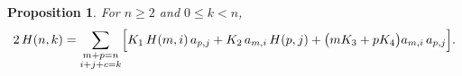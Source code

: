 \documentclass[11pt]{article}
\newtheorem{proposition}[theorem]{Proposition}
\theoremstyle{definition}
\theoremstyle{remark}
\begin{document}


\begin{proposition} \label{prop:forcing}
For $n\ge2$ and $0\le k<n$,
\begin{equation}\label{eq:forcing}
  2\,H(n,k)=\sum_{\substack{m+p=n\\ i+j+c=k}}
  \Bigl[K_1\,H(m,i)\,a_{p, j}+K_2\,a_{m, i}\,H(p,j)
  +\bigl(m K_3+p K_4\bigr)a_{m, i}\,a_{p, j}\Bigr].
\end{equation}
\end{proposition}
\end{document}
